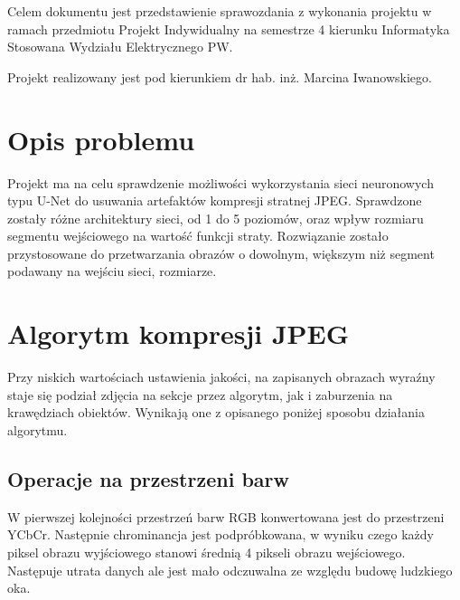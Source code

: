 \documentclass[a4paper, 12pt]{article}
\begin{document}
\maketitle
\thispagestyle{empty}
\newpage
\thispagestyle{empty}
Celem dokumentu jest przedstawienie sprawozdania z wykonania projektu w ramach przedmiotu Projekt Indywidualny na semestrze 4 kierunku Informatyka Stosowana Wydziału Elektrycznego PW.
\begin{center}
Projekt realizowany jest pod kierunkiem dr hab. inż. Marcina Iwanowskiego.
\end{center}
\thispagestyle{empty}
\newpage
\tableofcontents
\thispagestyle{empty}

\newpage
\section{Opis problemu}
\indent Projekt ma na celu sprawdzenie możliwości wykorzystania sieci neuronowych typu U-Net do usuwania artefaktów kompresji stratnej JPEG.
Sprawdzone zostały różne architektury sieci, od 1 do 5 poziomów, oraz wpływ rozmiaru segmentu wejściowego na wartość funkcji straty.
Rozwiązanie zostało przystosowane do przetwarzania obrazów o dowolnym, większym niż segment podawany na wejściu sieci, rozmiarze.
\section{Algorytm kompresji JPEG}
Przy niskich wartościach ustawienia jakości, na zapisanych obrazach wyraźny staje się podział zdjęcia na sekcje przez algorytm,
jak i zaburzenia na krawędziach obiektów. Wynikają one z opisanego poniżej sposobu działania algorytmu. \cite{JPEG}
\subsection{Operacje na przestrzeni barw}
W pierwszej kolejności przestrzeń barw RGB konwertowana jest do przestrzeni YCbCr.
Następnie chrominancja jest podpróbkowana, w wyniku czego każdy piksel obrazu wyjściowego stanowi średnią 4 pikseli obrazu wejściowego.
Następuje utrata danych ale jest mało odczuwalna ze względu budowę ludzkiego oka.
\end{document}
